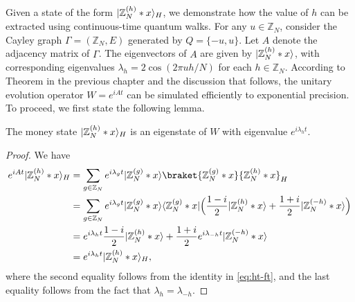 \documentclass[12pt]{report}
\begin{document}
    Given a state of the form $\lvert\mathbb{Z}_N^{(h)} * x\rangle_H$, we demonstrate how the value of $h$ can be extracted using continuous-time quantum walks. For any $u \in \mathbb{Z}_N$, consider the Cayley graph $\Gamma = (\mathbb{Z}_N, E)$ generated by $Q = {\{-u, u}\}$. Let $A$ denote the adjacency matrix of $\Gamma$. The eigenvectors of $A$ are given by $\lvert\mathbb{Z}_N^{(h)} * x\rangle$, with corresponding eigenvalues $\lambda_h = 2\cos(2\pi uh / N)$ for each $h \in \mathbb{Z}_N$. According to Theorem in the previous chapter and the discussion that follows, the unitary evolution operator $W = e^{iAt}$ can be simulated efficiently to exponential precision. To proceed, we first state the following lemma.




    \begin{lemma}
        \label{lem:h-eigen}
        The money state $\lvert\mathbb{Z}_N^{(h)} * x\rangle_H$ is an eigenstate of $W$ with eigenvalue $e^{i\lambda_h t}$.
    \end{lemma}
    \begin{proof}
        We have 
        \begin{align*}
            e^{iAt} \ket{\mathbb{Z}_N^{(h)} * x}_H
            & = \sum_{g \in \mathbb{Z}_N} e^{i\lambda_gt} \ket{\mathbb{Z}_N^{(g)} * x} \braket{\mathbb{Z}_N^{(g)} * x}{\mathbb{Z}_N^{(h)} * x}_H \\
            & = \sum_{g \in \mathbb{Z}_N} e^{i\lambda_gt} \ket{\mathbb{Z}_N^{(g)} * x} \bra{\mathbb{Z}_N^{(g)} * x} \Big( \frac{1 - i}{2} \ket{\mathbb{Z}_N^{(h)} * x} + \frac{1 + i}{2} \ket{\mathbb{Z}_N^{(-h)} * x} \Big) \\
            & = e^{i\lambda_{h}t} \frac{1 - i}{2} \ket{\mathbb{Z}_N^{(h)} * x} + \frac{1 + i}{2} e^{i\lambda_{-h}t} \ket{\mathbb{Z}_N^{(-h)} * x} \\
            & = e^{i\lambda_{h}t} \ket{\mathbb{Z}_N^{(h)} * x}_H,
        \end{align*}
        where the second equality follows from the identity in \eqref{eq:ht-ft}, and the last equality follows from the fact that $\lambda_h = \lambda_{-h}$.
    \end{proof}
\end{document}
